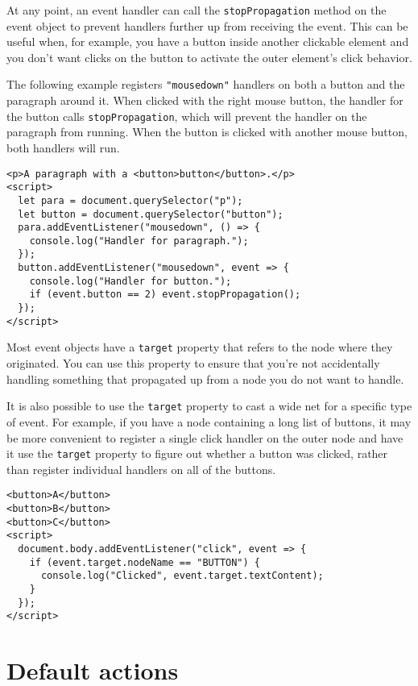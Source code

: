 At any point, an event handler can call the \lstinline`stopPropagation` method on the event object to prevent handlers further up from receiving the event. This can be useful when, for example, you have a button inside another clickable element and you don't want clicks on the button to activate the outer element's click behavior.

The following example registers \lstinline`"mousedown"` handlers on both a button and the paragraph around it. When clicked with the right mouse button, the handler for the button calls \lstinline`stopPropagation`, which will prevent the handler on the paragraph from running. When the button is clicked with another mouse button, both handlers will run.

\begin{lstlisting}
<p>A paragraph with a <button>button</button>.</p>
<script>
  let para = document.querySelector("p");
  let button = document.querySelector("button");
  para.addEventListener("mousedown", () => {
    console.log("Handler for paragraph.");
  });
  button.addEventListener("mousedown", event => {
    console.log("Handler for button.");
    if (event.button == 2) event.stopPropagation();
  });
</script>
\end{lstlisting}
\noindent{}

Most event objects have a \lstinline`target` property that refers to the node where they originated. You can use this property to ensure that you're not accidentally handling something that propagated up from a node you do not want to handle.

It is also possible to use the \lstinline`target` property to cast a wide net for a specific type of event. For example, if you have a node containing a long list of buttons, it may be more convenient to register a single click handler on the outer node and have it use the \lstinline`target` property to figure out whether a button was clicked, rather than register individual handlers on all of the buttons.

\begin{lstlisting}
<button>A</button>
<button>B</button>
<button>C</button>
<script>
  document.body.addEventListener("click", event => {
    if (event.target.nodeName == "BUTTON") {
      console.log("Clicked", event.target.textContent);
    }
  });
</script>
\end{lstlisting}
\noindent

\section{Default actions}

